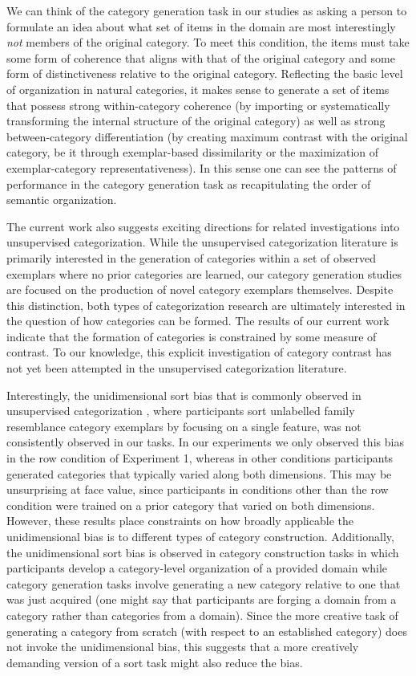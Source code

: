 \documentclass[12pt]{article}
\begin{document}
\begin{flushleft}
We can think of the category generation task in our studies as asking a person
to formulate an idea about what set of items in the domain are most
interestingly {\em not} members of the original category. To meet this
condition, the items must take some form of coherence that aligns with that of
the original category and some form of distinctiveness relative to the original
category. Reflecting the basic level of organization in natural categories, it
makes sense to generate a set of items that possess strong within-category
coherence (by importing or systematically transforming the internal structure of
the original category) as well as strong between-category differentiation (by
creating maximum contrast with the original category, be it through
exemplar-based dissimilarity or the maximization of exemplar-category
representativeness). In this sense one can see the patterns of performance in
the category generation task as recapitulating the order of semantic
organization.

The current work also suggests exciting directions for related investigations
into unsupervised categorization. While the unsupervised categorization
literature is primarily interested in the generation of categories within a set
of observed exemplars where no prior categories are learned, our category
generation studies are focused on the production of novel category exemplars
themselves. Despite this distinction, both types of categorization research are
ultimately interested in the question of how categories can be formed. The results
of our current work indicate that the formation of categories is constrained by
some measure of contrast. To our knowledge, this explicit investigation of
category contrast has not yet been attempted in the unsupervised categorization
literature. 

Interestingly, the unidimensional sort bias that is commonly observed in
unsupervised categorization
\citep{imai1965discriminability,milton2004influence,ahn1992two}, where
participants sort unlabelled family resemblance category exemplars by focusing
on a single feature, was not consistently observed in our tasks. In our
experiments we only observed this bias in the row condition of Experiment 1,
whereas in other conditions participants generated categories that typically
varied along both dimensions. This may be unsurprising at face value, since
participants in conditions other than the row condition were trained on a prior
category that varied on both dimensions. However, these results place constraints on how broadly applicable the 
unidimensional bias is to different types of category construction. Additionally, the
unidimensional sort bias is observed in category construction tasks in which
participants develop a category-level organization of a provided domain while
category generation tasks involve generating a new category relative to one that
was just acquired (one might say that participants are forging a domain from a
category rather than categories from a domain). Since the more creative task of
generating a category from scratch (with respect to an established category)
does not invoke the unidimensional bias, this suggests that a more creatively
demanding version of a sort task might also reduce the bias.


\end{flushleft}
\end{document}
